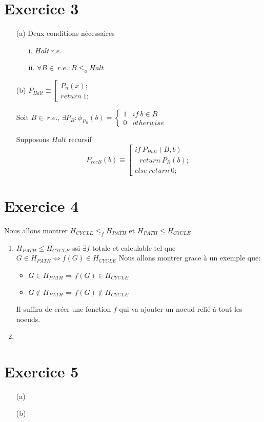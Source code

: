 \documentclass[a4paper, 11pt, onecolumn]{article}
\begin{document}
\section*{Exercice 3}
\begin{itemize}
	\item[(a)] Deux conditions nécessaires
		\begin{itemize}
			\item[i.] $Halt \ r.e.$
			\item[ii.] $\forall B \in \ r.e. : B \leq_a Halt$
		\end{itemize}
	\item[(b)] $P_{Halt} \equiv \left[ \begin{array}{l}P_n(x);\\return\ 1; \end{array} \right.$

Soit $B \in \ r.e.$, $\exists P_B : \phi_{P_B}(b) = 
\left\{
\begin{array}{ll}
	1 & if \ b \in B \\ 
	0 & otherwise
\end{array}
\right.$

Supposons $Halt$ recursif
$$P_{recB}(b) \equiv 
\left[
\begin{array}{l}
if\ P_{Halt}(B,b)\\
\ \ \ return \ P_B(b);\\
else\ return \ 0;
\end{array}
\right.
$$
\end{itemize}
    
\section*{Exercice 4}
Nous allons montrer $H_{CYCLE} \leq_f H_{PATH}$ et $H_{PATH} \leq H_{CYCLE}$
\begin{enumerate}
	\item $H_{PATH} \leq H_{CYCLE}$ ssi $\exists f$ totale et calculable tel que $G \in H_{PATH} \Leftrightarrow f(G) \in H_{CYCLE}$ Nous allons montrer grace à un exemple que:
	\begin{itemize}
		\item $G \in H_{PATH} \Rightarrow f(G) \in H_{CYCLE}$
		\item $G \notin H_{PATH} \Rightarrow f(G) \notin H_{CYCLE}$
	\end{itemize}
	Il suffira de créer une fonction $f$ qui va ajouter un noeud relié à tout les noeuds.
	\item
\end{enumerate}

\section*{Exercice 5}

\begin{itemize}
	\item[(a)]
	\item[(b)]
\end{itemize}
\end{document}
